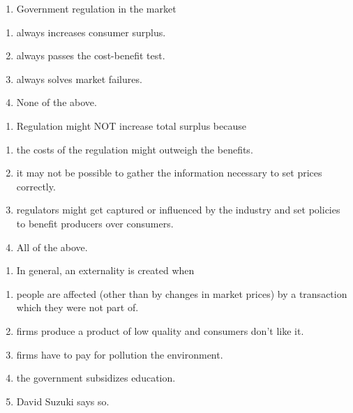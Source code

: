 \documentclass[11pt,]{article}
\providecommand{\tightlist}{%
  \setlength{\itemsep}{0pt}\setlength{\parskip}{0pt}}
\begin{document}
\begin{enumerate}
\def\labelenumi{\arabic{enumi})}
\setcounter{enumi}{11}
\tightlist
\item
  Government regulation in the market
\end{enumerate}

\begin{enumerate}
\def\labelenumi{\Alph{enumi})}
\tightlist
\item
  always increases consumer surplus.
\item
  always passes the cost-benefit test.
\item
  always solves market failures.
\item
  None of the above. \newpage
\end{enumerate}

\begin{enumerate}
\def\labelenumi{\arabic{enumi})}
\setcounter{enumi}{12}
\tightlist
\item
  Regulation might NOT increase total surplus because
\end{enumerate}

\begin{enumerate}
\def\labelenumi{\Alph{enumi})}
\tightlist
\item
  the costs of the regulation might outweigh the benefits.
\item
  it may not be possible to gather the information necessary to set
  prices correctly.
\item
  regulators might get captured or influenced by the industry and set
  policies to benefit producers over consumers.
\item
  All of the above.
\end{enumerate}

\begin{enumerate}
\def\labelenumi{\arabic{enumi})}
\setcounter{enumi}{13}
\tightlist
\item
  In general, an externality is created when
\end{enumerate}

\begin{enumerate}
\def\labelenumi{\Alph{enumi})}
\tightlist
\item
  people are affected (other than by changes in market prices) by a
  transaction which they were not part of.
\item
  firms produce a product of low quality and consumers don't like it.
\item
  firms have to pay for pollution the environment.
\item
  the government subsidizes education.
\item
  David Suzuki says so.
\end{enumerate}
\end{document}
